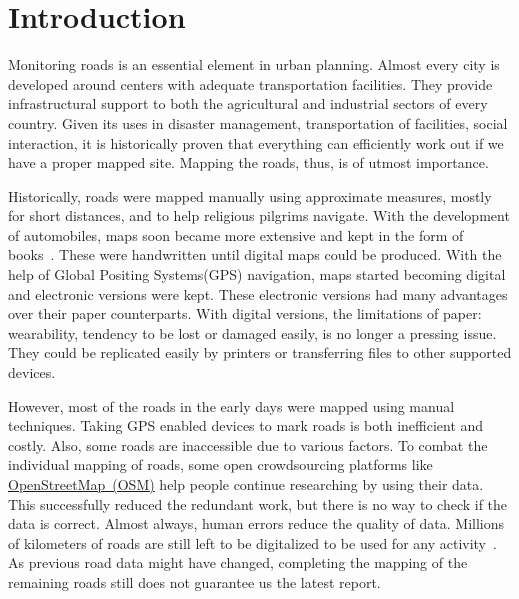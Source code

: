 \chapter{Introduction}\label{chapt:intro}

Monitoring roads is an essential element in urban planning. Almost every city is developed around centers with adequate transportation facilities. They provide infrastructural support to both the agricultural and industrial sectors of every country. Given its uses in disaster management, transportation of facilities, social interaction, it is historically proven that everything can efficiently work out if we have a proper mapped site. Mapping the roads, thus, is of utmost importance.

Historically, roads were mapped manually using approximate measures, mostly for short distances, and to help religious pilgrims navigate. With the development of automobiles, maps soon became more extensive and kept in the form of books~\cite{firstMapBooks}. These were handwritten until digital maps could be produced. With the help of Global Positing Systems(GPS) navigation, maps started becoming digital and electronic versions were kept. These electronic versions had many advantages over their paper counterparts. With digital versions, the limitations of paper: wearability, tendency to be lost or damaged easily, is no longer a pressing issue. They could be replicated easily by printers or transferring files to other supported devices.

However, most of the roads in the early days were mapped using manual techniques. Taking GPS enabled devices to mark roads is both inefficient and costly. Also, some roads are inaccessible due to various factors. To combat the individual mapping of roads, some open crowdsourcing platforms like \href{https://www.openstreetmap.org/}{OpenStreetMap~(OSM)}  help people continue researching by using their data. This successfully reduced the redundant work, but there is no way to check if the data is correct. Almost always, human errors reduce the quality of data. Millions of kilometers of roads are still left to be digitalized to be used for any activity~\cite{MapsDoneOSM}. As previous road data might have changed, completing the mapping of the remaining roads still does not guarantee us the latest report.

